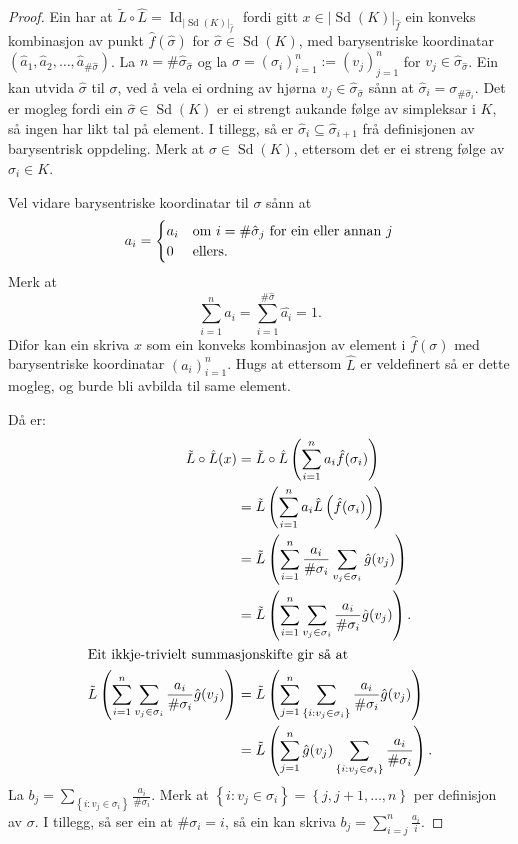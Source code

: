\documentclass[a4paper, 12pt, norsk]{article}
\theoremstyle{plain}
\theoremstyle{definition}
\newcommand{\gr}[1]{ \lvert #1 \rvert } %
\newcommand{\set}[1]{ \left\{ #1 \right\} } %
\newcommand{\tuple}[1]{ \left( #1 \right) } %
\DeclareMathOperator{\Sd}{Sd} %
\DeclareMathOperator{\Id}{Id} %
\begin{document}
\begin{proof}
	Ein har at \( \tilde{L}\circ\hat{L} = \Id_{\gr{\Sd(K)}_{\hat{f}}} \) fordi gitt \( x \in \gr{\Sd(K)}_{\hat{f}} \) ein konveks kombinasjon av punkt \( \hat{f}(\hat{\sigma}) \) for \( \hat{\sigma} \in \Sd(K) \), med barysentriske koordinatar \( \tuple{\hat{a}_1, \hat{a}_2, \dots, \hat{a}_{\#\hat{\sigma}}} \). La \( n = \#\hat{\sigma}_{\hat{\sigma}} \) og la \( \sigma = \tuple{\sigma_i}_{i=1}^{n} := \tuple{v_j}_{j=1}^{n} \) for \( v_j \in \hat{\sigma}_{\hat{\sigma}} \). Ein kan utvida \( \hat{\sigma} \) til \( \sigma \), ved å vela ei ordning av hjørna \( v_j \in \hat{\sigma}_{\hat{\sigma}} \) sånn at \( \hat{\sigma}_i = \sigma_{\#\hat{\sigma}_i} \). Det er mogleg fordi ein \( \hat{\sigma} \in \Sd(K) \) er ei strengt aukande følge av simpleksar i \( K \), så ingen har likt tal på element. I tillegg, så er \( \hat{\sigma}_i \subseteq \hat{\sigma}_{i+1} \) frå definisjonen av barysentrisk oppdeling. Merk at \( \sigma \in \Sd(K) \), ettersom det er ei streng følge av \( \sigma_i \in K \).

	Vel vidare barysentriske koordinatar til \( \sigma \) sånn at
	\[
		a_i =
		\begin{cases}
			a_i & \text{om \( i = \#\hat{\sigma}_j \) for ein eller annan \( j \)} \\
			0 & \text{ellers}.
		\end{cases}
	\]
	Merk at
	\[
		\sum_{i=1}^n a_i = \sum_{i=1}^{\#\hat{\sigma}}\hat{a_i}=1.
	\]
	Difor kan ein skriva \( x \) som ein konveks kombinasjon av element i \( \hat{f}(\sigma) \) med barysentriske koordinatar \( \tuple{a_i}_{i=1}^n \). Hugs at ettersom \( \hat{L} \) er veldefinert så er dette mogleg, og burde bli avbilda til same element.

	Då er:
	\begin{align*}
		\tilde{L}\circ\hat{L}(x) &= \tilde{L}\circ\hat{L}\tuple{\sum_{i=1}^n a_i \hat{f}(\sigma_i)} \\
		&= \tilde{L}\tuple{\sum_{i=1}^n a_i \hat{L}\tuple{\hat{f}(\sigma_i)}} \\
		&= \tilde{L}\tuple{\sum_{i=1}^n \frac{a_i}{\#\sigma_i}\sum_{v_j \in \sigma_i}\hat{g}(v_j)} \\
		&= \tilde{L}\tuple{\sum_{i=1}^n\sum_{v_j \in \sigma_i}\frac{a_i}{\#\sigma_i}\hat{g}(v_j)}. \\
		\intertext{Eit ikkje-trivielt summasjonskifte gir så at}
		\tilde{L}\tuple{\sum_{i=1}^n\sum_{v_j \in \sigma_i}\frac{a_i}{\#\sigma_i}\hat{g}(v_j)} &= \tilde{L}\tuple{\sum_{j=1}^n\sum_{\set{i:v_j\in\sigma_i}}\frac{a_i}{\#\sigma_i}\hat{g}(v_j)} \\
		&= \tilde{L}\tuple{\sum_{j=1}^n \hat{g}(v_j) \sum_{\set{i:v_j\in\sigma_i}}\frac{a_i}{\#\sigma_i}}.
	\end{align*}
	La \( b_j = \sum_{\set{i:v_j\in\sigma_i}}\frac{a_i}{\#\sigma_i} \). Merk at \( \set{i : v_j \in \sigma_i} = \set{j, j+1, \dots, n } \) per definisjon av \( \sigma \). I tillegg, så ser ein at \( \#\sigma_i = i \), så ein kan skriva \( b_j = \sum_{i=j}^n \frac{a_i}{i} \).


\end{proof}
\end{document}
